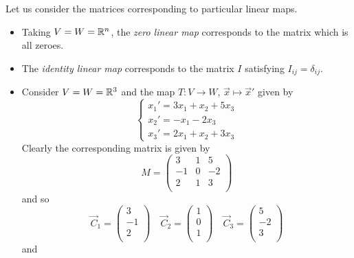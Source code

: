 \documentclass{../template/note}
\begin{document}
    \begin{example}
        Let us consider the matrices corresponding to particular linear maps.
        \begin{itemize}
            \item Taking \(V = W = \mathbb R^n\), the \emph{zero linear map} corresponds to the matrix which is all zeroes.
            \item The \emph{identity linear map} corresponds to the matrix \(I\) satisfying \(I_{ij} = \delta_{ij}\).
            \item Consider \(V = W = \mathbb R^3\) and the map \(T: V \to W\), \(\vec x \mapsto \vec x'\) given by
            \[
                \begin{cases}
                    x_1' = 3x_1 + x_2 + 5x_3 \\
                    x_2' = -x_1 - 2x_3 \\
                    x_3' = 2x_1 + x_2 + 3x_3
                \end{cases}
            \]
            Clearly the corresponding matrix is given by
            \[
                M = \begin{pmatrix}
                 3 & 1 & 5 \\
                 -1 & 0 & -2 \\
                 2 & 1 & 3 \\
                \end{pmatrix}
            \]
            and so
            \[
                \vec C_1 = \begin{pmatrix}
                 3 \\
                 -1 \\
                 2 \\
                \end{pmatrix} \quad
                \vec C_2 = \begin{pmatrix}
                 1 \\
                 0 \\
                 1 \\
                \end{pmatrix} \quad
                \vec C_3 = \begin{pmatrix}
                 5 \\
                 -2 \\
                 3 \\
                \end{pmatrix}
            \]
            and
            \begin{align*}

\end{align*}
\end{itemize}
\end{example}
\end{document}
